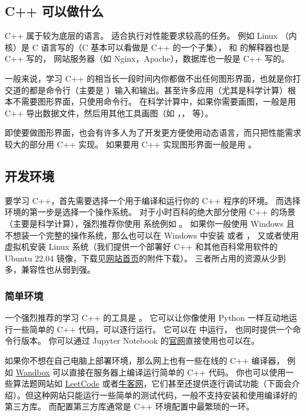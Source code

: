 
\subsection{C++ 可以做什么}
C++ 属于较为底层的语言。 适合执行对性能要求较高的任务。 例如 Linux （内核）是 C 语言写的（C 基本可以看做是 C++ 的一个子集），  和  的解释器也是 C++ 写的， 网站服务器（如 Nginx，Apache），数据库也一般是 C++ 写的。

一般来说，学习 C++ 的相当长一段时间内你都做不出任何图形界面，也就是你打交道的都是命令行（主要是 ）输入和输出。甚至许多应用（尤其是科学计算）根本不需要图形界面，只使用命令行。 在科学计算中，如果你需要画图，一般是用 C++ 导出数据文件，然后用其他工具画图（如 ，， 等）。

即使要做图形界面，也会有许多人为了开发更方便使用动态语言，而只把性能需求较大的部分用 C++ 实现。 如果要用 C++ 实现图形界面一般是用 。

\subsection{开发环境}
要学习 C++，首先需要选择一个用于编译和运行你的 C++ 程序的环境。 而选择环境的第一步是选择一个操作系统。 对于小时百科的绝大部分使用 C++ 的场景（主要是科学计算），强烈推荐你使用  系统例如 。 如果你一般使用 Windows 且不想装一个完整的操作系统，那么也可以在 Windows 中安装  或者 ， 又或者使用  虚拟机安装 Linux 系统（我们提供一个部署好 C++ 和其他百科常用软件的 Ubuntu 22.04 镜像，下载见\href{https://wuli.wiki}{网站首页}的附件下载）。 三者所占用的资源从少到多，兼容性也从弱到强。

\subsubsection{简单环境}
一个强烈推荐的学习 C++ 的工具是 。 它可以让你像使用 Python 一样互动地运行一些简单的 C++ 代码，可以逐行运行。 它可以在  中运行， 也同时提供一个命令行版本。 你可以通过 Jupyter Notebook 的\href{https://jupyter.org/}{官网}直接使用也可以在。

如果你不想在自己电脑上部署环境，那么网上也有一些在线的 C++ 编译器， 例如 \href{https://wandbox.org/}{Wandbox} 可以直接在服务器上编译运行简单的 C++ 代码。 你也可以使用一些算法题网站如 \href{https://leetcode.com/}{LeetCode} 或者\href{https://www.nowcoder.com/}{牛客网}，它们甚至还提供逐行调试功能（下面会介绍）。但这种网站只能运行一些简单的测试代码，一般不支持安装和使用编译好的第三方库。 而配置第三方库通常是 C++ 环境配置中最繁琐的一环。

